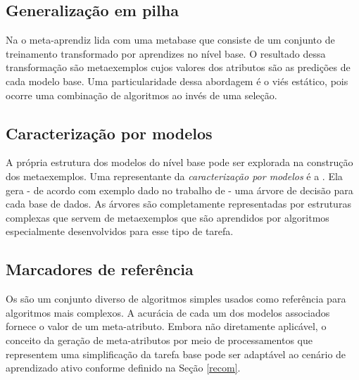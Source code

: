 \subsection{Generalização em pilha}
Na 
\citep{journals/nn/Wolpert92} o meta-aprendiz lida com uma metabase
que consiste de um conjunto de treinamento transformado por
aprendizes no nível base.
O resultado dessa transformação são metaexemplos cujos valores dos atributos
são as predições de cada modelo base.
Uma particularidade dessa abordagem é o viés estático,
pois ocorre uma combinação de algoritmos ao invés de uma seleção.

\subsection{Caracterização por modelos}
A própria estrutura dos modelos do nível base pode ser explorada na construção dos
metaexemplos.
Uma representante da \textit{caracterização por modelos} é a
.
Ela gera - de acordo com exemplo dado no trabalho de
\cite{conf/ilp/BensusanGK00} - uma árvore de decisão para cada
base de dados.
As árvores são completamente representadas por estruturas complexas
que servem de metaexemplos que são aprendidos por algoritmos especialmente
desenvolvidos para esse tipo de tarefa.

\subsection{Marcadores de referência}
Os  \citep{pfahringer2000tell}
são um conjunto diverso de algoritmos simples usados como referência para
algoritmos mais complexos.
A acurácia de cada um dos modelos associados fornece o valor de um meta-atributo.
Embora não diretamente aplicável, o conceito da geração de meta-atributos por meio
de processamentos que representem uma simplificação da tarefa base pode
ser adaptável ao cenário de aprendizado ativo conforme definido na Seção \ref{recom}.

